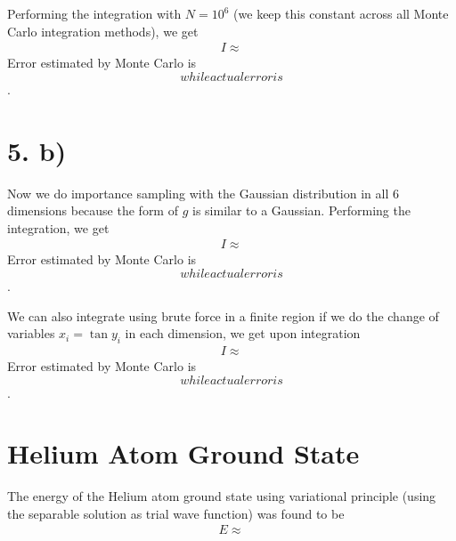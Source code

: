 \documentclass{article}
\begin{document}
Performing the integration with $N = 10^6$ (we keep this constant across all Monte Carlo integration methods), we get
\begin{align*}
    I \approx 
\end{align*}
Error estimated by Monte Carlo is $$ while actual error is $$.

\section*{5. b)}

Now we do importance sampling with the Gaussian distribution in all 6 dimensions because the form of $g$ is similar to a Gaussian.
Performing the integration, we get
\begin{align*}
    I \approx 
\end{align*}
Error estimated by Monte Carlo is $$ while actual error is $$.

We can also integrate using brute force in a finite region if we do the change of variables $x_i = \tan y_i$ in each dimension,
we get upon integration
\begin{align*}
    I \approx 
\end{align*}
Error estimated by Monte Carlo is $$ while actual error is $$.

\section*{Helium Atom Ground State}

The energy of the Helium atom ground state using variational principle (using the separable solution as trial wave function) was found to be
\begin{align*}
    E \approx 
\end{align*}
\end{document}
